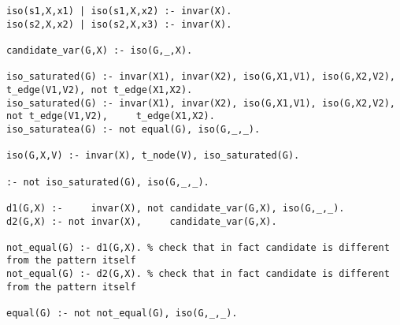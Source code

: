 \begin{lstlisting}[caption=Canonicity previous solution isomorphism check, style=model]
iso(s1,X,x1) | iso(s1,X,x2) :- invar(X).
iso(s2,X,x2) | iso(s2,X,x3) :- invar(X).

candidate_var(G,X) :- iso(G,_,X).

iso_saturated(G) :- invar(X1), invar(X2), iso(G,X1,V1), iso(G,X2,V2),     t_edge(V1,V2), not t_edge(X1,X2). 
iso_saturated(G) :- invar(X1), invar(X2), iso(G,X1,V1), iso(G,X2,V2), not t_edge(V1,V2),     t_edge(X1,X2). 
iso_saturatea(G) :- not equal(G), iso(G,_,_). 

iso(G,X,V) :- invar(X), t_node(V), iso_saturated(G).

:- not iso_saturated(G), iso(G,_,_).

d1(G,X) :-     invar(X), not candidate_var(G,X), iso(G,_,_).
d2(G,X) :- not invar(X),     candidate_var(G,X).

not_equal(G) :- d1(G,X). % check that in fact candidate is different from the pattern itself
not_equal(G) :- d2(G,X). % check that in fact candidate is different from the pattern itself

equal(G) :- not not_equal(G), iso(G,_,_).
\end{lstlisting}

